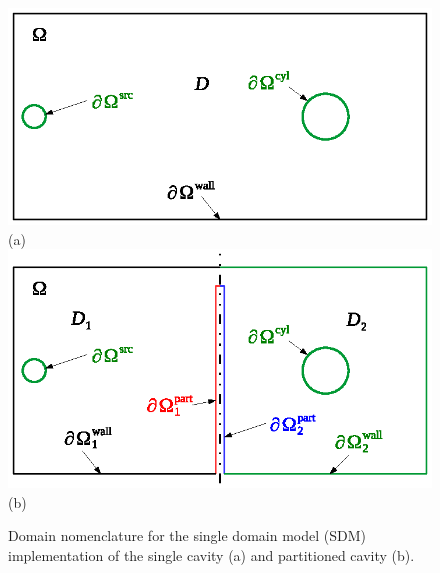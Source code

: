 \documentclass[a4paper]{article}
\numberwithin{equation}{section}
\begin{document}
\begin{figure}[ht]
\begin{center}
\includegraphics[width=0.6\linewidth]{figures/domains0}\\
{\footnotesize (a)}\\
\vspace{-4mm}
\includegraphics[width=0.6\linewidth]{figures/domains1}\\
{\footnotesize (b)}\\
\vspace{0mm}
\caption{\label{fg:sdm} Domain nomenclature for the single domain model (SDM) implementation of the 
single cavity (a) and partitioned cavity (b).}
\end{center}
\end{figure}
\end{document}
